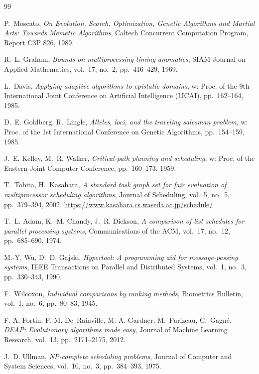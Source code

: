 \documentclass[12pt,a4paper]{article}
\begin{document}
\begin{thebibliography}{99}

P.~Moscato,
\textit{On Evolution, Search, Optimization, Genetic Algorithms and Martial Arts: Towards Memetic Algorithms},
Caltech Concurrent Computation Program, Report C3P 826, 1989.

R.~L. Graham,
\textit{Bounds on multiprocessing timing anomalies},
SIAM Journal on Applied Mathematics, vol.~17, no.~2, pp.~416--429, 1969.

L.~Davis,
\textit{Applying adaptive algorithms to epistatic domains},
w: Proc. of the 9th International Joint Conference on Artificial Intelligence (IJCAI), pp.~162--164, 1985.

D.~E. Goldberg, R.~Lingle,
\textit{Alleles, loci, and the traveling salesman problem},
w: Proc. of the 1st International Conference on Genetic Algorithms, pp.~154--159, 1985.

J.~E. Kelley, M.~R. Walker,
\textit{Critical-path planning and scheduling},
w: Proc. of the Eastern Joint Computer Conference, pp.~160--173, 1959.

T.~Tobita, H.~Kasahara,
\textit{A standard task graph set for fair evaluation of multiprocessor scheduling algorithms},
Journal of Scheduling, vol.~5, no.~5, pp.~379--394, 2002.
\url{https://www.kasahara.cs.waseda.ac.jp/schedule/}

T.~L. Adam, K.~M. Chandy, J.~R. Dickson,
\textit{A comparison of list schedules for parallel processing systems},
Communications of the ACM, vol.~17, no.~12, pp.~685--690, 1974.

M.-Y. Wu, D.~D. Gajski,
\textit{Hypertool: A programming aid for message-passing systems},
IEEE Transactions on Parallel and Distributed Systems, vol.~1, no.~3, pp.~330--343, 1990.

F.~Wilcoxon,
\textit{Individual comparisons by ranking methods},
Biometrics Bulletin, vol.~1, no.~6, pp.~80--83, 1945.

F.-A. Fortin, F.-M. De~Rainville, M.-A. Gardner, M.~Parizeau, C.~Gagné,
\textit{DEAP: Evolutionary algorithms made easy},
Journal of Machine Learning Research, vol.~13, pp.~2171--2175, 2012.

J.~D. Ullman,
\textit{NP-complete scheduling problems},
Journal of Computer and System Sciences, vol.~10, no.~3, pp.~384--393, 1975.


\end{thebibliography}
\end{document}
